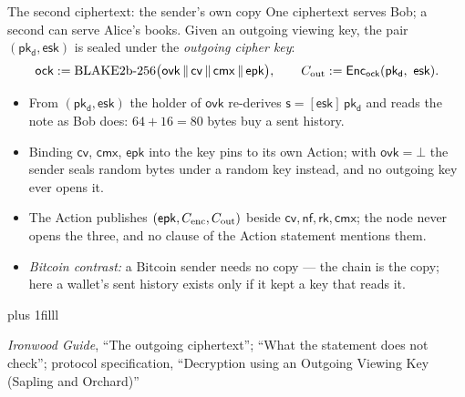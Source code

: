 \documentclass[aspectratio=169,11pt]{beamer}
\newcommand{\nfsym}{\ensuremath{\mathsf{nf}}}
\newcommand{\cmx}{\ensuremath{\mathsf{cmx}}}
\newcommand{\cvsym}{\ensuremath{\mathsf{cv}}}
\newcommand{\rksym}{\ensuremath{\mathsf{rk}}}
\newcommand{\pkd}{\ensuremath{\mathsf{pk_d}}}
\newcommand{\ovk}{\ensuremath{\mathsf{ovk}}}
\newcommand{\esk}{\ensuremath{\mathsf{esk}}}
\newcommand{\epk}{\ensuremath{\mathsf{epk}}}
\newcommand{\src}[1]{\par\vskip0pt plus 1filll
  {\fontsize{6}{7.2}\selectfont\color{arbdim}\raggedright #1\par}}
\begin{document}
\begin{frame}{The second ciphertext: the sender's own copy}
One ciphertext serves Bob; a second can serve Alice's books. Given an
outgoing viewing key, the pair $(\pkd, \esk)$ is sealed under the
\emph{outgoing cipher key}:
\[
\Fock := \mathrm{BLAKE2b\text{-}256}\bigl(\ovk \,\|\, \cvsym \,\|\,
  \cmx \,\|\, \epk\bigr), \qquad
\Fout := \mathsf{Enc}_{\Fock}(\pkd,\ \esk).
\]
\begin{itemize}
  \item From $(\pkd, \esk)$ the holder of \ovk{} re-derives
    $\mathsf{s} = [\esk]\,\pkd$ and reads the note as Bob does: $64 + 16
    = 80$ bytes buy a sent history.
  \item Binding \cvsym, \cmx, \epk{} into the key pins \Fout{} to its own
    Action; with $\ovk = \bot$ the sender seals random bytes under a
    random key instead, and no outgoing key ever opens it.
  \item The Action publishes $(\epk, \Fenc, \Fout)$ beside
    $\cvsym, \nfsym, \rksym, \cmx$; the node never opens the three, and
    no clause of the Action statement mentions them.
  \item \emph{Bitcoin contrast:} a Bitcoin sender needs no copy --- the
    chain is the copy; here a wallet's sent history exists only if it
    kept a key that reads it.
\end{itemize}
\src{\emph{Ironwood Guide}, ``The outgoing ciphertext''; ``What the statement
  does not check''; protocol specification, ``Decryption using an Outgoing
  Viewing Key (Sapling and Orchard)''}
\end{frame}
\end{document}
